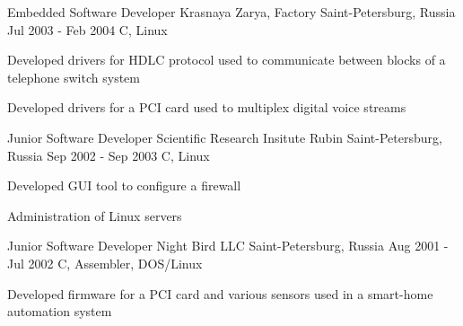 \begin{cventries}
  \cventry
    {Embedded Software Developer} %
    {Krasnaya Zarya, Factory} %
    {Saint-Petersburg, Russia} %
    {Jul 2003 - Feb 2004} %
    {C, Linux}
    {
      \begin{cvitems} %
		\item {Developed drivers for HDLC protocol used to communicate between blocks of a telephone switch system}
		\item {Developed drivers for a PCI card used to multiplex digital voice streams}
      \end{cvitems}
    }

  \cventry
    {Junior Software Developer} %
    {Scientific Research Insitute \textquotedbl{}Rubin\textquotedbl{}} %
    {Saint-Petersburg, Russia} %
    {Sep 2002 - Sep 2003} %
    {C, Linux}
    {
      \begin{cvitems} %
		\item {Developed GUI tool to configure a firewall}
		\item {Administration of Linux servers}
      \end{cvitems}
    }

  \cventry
    {Junior Software Developer} %
    {Night Bird LLC} %
    {Saint-Petersburg, Russia} %
    {Aug 2001 - Jul 2002} %
    {C, Assembler, DOS/Linux}
    {
      \begin{cvitems} %
		\item {Developed firmware for a PCI card and various sensors used in a smart-home automation system}
      \end{cvitems}
    }

\end{cventries}
